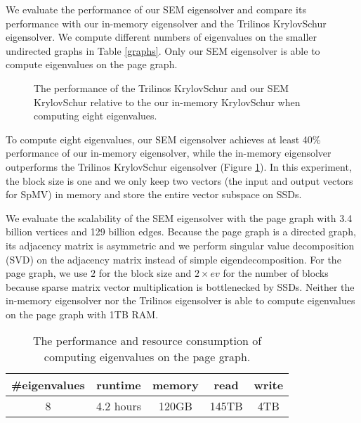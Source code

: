 We evaluate the performance of our SEM eigensolver and compare its performance
with our in-memory eigensolver and the Trilinos KrylovSchur eigensolver.
We compute different numbers of eigenvalues on the smaller undirected graphs in
Table \ref{graphs}. Only our SEM eigensolver is able to compute eigenvalues
on the page graph.

\begin{figure}
	\begin{center}
		\footnotesize
		
		\caption{The performance of the Trilinos KrylovSchur and our SEM KrylovSchur
		relative to the our in-memory KrylovSchur when computing eight eigenvalues.}
		\label{fig:eigen}
	\end{center}
\end{figure}

To compute eight eigenvalues, our SEM eigensolver achieves at least 40\%
performance of our in-memory eigensolver, while the in-memory eigensolver
outperforms the Trilinos KrylovSchur eigensolver (Figure \ref{fig:eigen}).
In this experiment, the block size is one and we only keep two vectors
(the input and output vectors for SpMV) in memory and store the entire
vector subspace on SSDs.


We evaluate the scalability of the SEM eigensolver with the page graph with 3.4 billion
vertices and 129 billion edges. Because the page graph is a directed graph,
its adjacency matrix is asymmetric and we perform singular value decomposition
(SVD) on the adjacency matrix instead of simple eigendecomposition. For the page
graph, we use $2$ for the block size and $2 \times ev$ for the number of blocks
because sparse matrix vector multiplication is bottlenecked by SSDs.
Neither the in-memory eigensolver nor the Trilinos eigensolver is able
to compute eigenvalues on the page graph with 1TB RAM.

\begin{table}
	\begin{center}
		\small
		\begin{tabular}{|c|c|c|c|c|}
			\hline
			\#eigenvalues & runtime & memory & read & write \\
			\hline
			8 & 4.2 hours & 120GB & 145TB & 4TB \\
			\hline
		\end{tabular}
		\normalsize
	\end{center}
	\caption{The performance and resource consumption of computing eigenvalues
	on the page graph.}
	\label{pg_ev}
\end{table}

